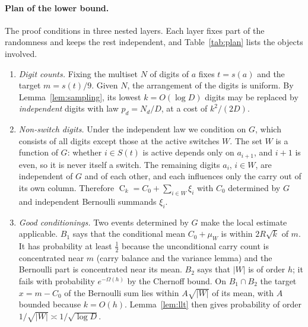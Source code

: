 \documentclass[11pt]{article}
\theoremstyle{definition}
\theoremstyle{remark}
\newcommand{\C}{\operatorname{C}}
\begin{document}
\paragraph{Plan of the lower bound.} The proof conditions in three nested
layers. Each layer fixes part of the randomness and keeps the rest
independent, and Table~\ref{tab:plan} lists the objects involved.
\begin{enumerate}
\item \emph{Digit counts.} Fixing the multiset $N$ of digits of $a$ fixes
$t=s(a)$ and the target $m=s(t)/9$. Given $N$, the arrangement of the digits
is uniform. By Lemma~\ref{lem:sampling}, its lowest $k=O(\log D)$ digits may
be replaced by \emph{independent} digits with law $p_d=N_d/D$, at a cost of
$k^2/(2D)$.
\item \emph{Non-switch digits.} Under the independent law we condition on $G$,
which consists of all digits except those at the active switches $W$. The set
$W$ is a function of $G$: whether $i\in S(t)$ is active depends only on
$a_{i+1}$, and $i+1$ is even, so it is never itself a switch. The remaining
digits $a_i$, $i\in W$, are independent of $G$ and of each other, and each
influences only the carry out of its own column. Therefore
$\C_k=C_0+\sum_{i\in W}\xi_i$ with $C_0$ determined by $G$ and independent
Bernoulli summands $\xi_i$.
\item \emph{Good conditionings.} Two events determined by $G$ make the local
estimate applicable. $B_1$ says that the conditional mean $C_0+\mu_W$ is within
$2R\sqrt k$ of $m$. It has probability at least $\frac12$ because the
unconditional carry count is concentrated near $m$ (carry balance and the
variance lemma) and the Bernoulli part is concentrated near its mean. $B_2$
says that $|W|$ is of order $h$; it fails with probability
$e^{-\Omega(h)}$ by the Chernoff bound. On $B_1\cap B_2$ the target
$x=m-C_0$ of the Bernoulli sum lies within $A\sqrt{|W|}$ of its mean, with
$A$ bounded because $k=O(h)$. Lemma~\ref{lem:llt} then gives probability of
order $1/\sqrt{|W|}\asymp1/\sqrt{\log D}$.
\end{enumerate}
\end{document}
